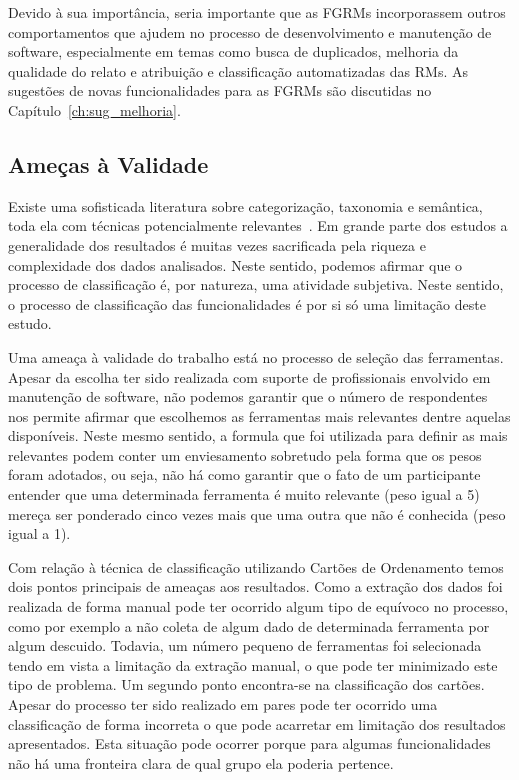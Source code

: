 Devido à sua importância, seria importante que as FGRMs incorporassem outros
comportamentos que ajudem no processo de desenvolvimento e manutenção de
software, especialmente em temas como busca de duplicados, melhoria da qualidade
do relato e atribuição e classificação automatizadas das RMs. As sugestões de
novas funcionalidades para as FGRMs são discutidas no
Capítulo~\ref{ch:sug_melhoria}.

\subsection{Ameças à Validade}
\label{sec:ameacas_a_validade}

Existe uma sofisticada literatura sobre categorização, taxonomia e semântica,
toda ela com técnicas potencialmente relevantes~\cite{rugg2005sorting}. Em
grande parte dos estudos a generalidade dos resultados é muitas vezes
sacrificada pela riqueza e complexidade dos dados analisados. Neste sentido,
podemos afirmar que o processo de classificação é, por natureza, uma atividade
subjetiva. Neste sentido, o processo de classificação das funcionalidades é por
si só uma limitação deste estudo.

Uma ameaça à validade do trabalho está no processo de seleção das ferramentas.
Apesar da escolha ter sido realizada com suporte de profissionais envolvido em
manutenção de software, não podemos garantir que o número de respondentes nos
permite afirmar que escolhemos as ferramentas mais relevantes dentre aquelas
disponíveis. Neste mesmo sentido, a formula que foi utilizada para definir as
mais relevantes podem conter um enviesamento sobretudo pela forma que os pesos
foram adotados, ou seja, não há como garantir que o fato de um participante
entender que uma determinada ferramenta é muito relevante (peso igual a 5)
mereça ser ponderado cinco vezes mais que uma outra que não é conhecida (peso
igual a 1).

Com relação à técnica de classificação utilizando Cartões de Ordenamento temos
dois pontos principais de ameaças aos resultados. Como a extração dos dados foi
realizada de forma manual pode ter ocorrido algum tipo de equívoco no processo,
como por exemplo a não coleta de algum dado de determinada ferramenta por algum
descuido. Todavia, um número pequeno de ferramentas foi selecionada tendo em
vista a limitação da extração manual, o que pode ter minimizado este tipo de
problema. Um segundo ponto encontra-se na classificação dos cartões. Apesar do
processo ter sido realizado em pares pode ter ocorrido uma classificação de
forma incorreta o que pode acarretar em limitação dos resultados apresentados.
Esta situação pode ocorrer porque para algumas funcionalidades não há uma
fronteira clara de qual grupo ela poderia pertence.

